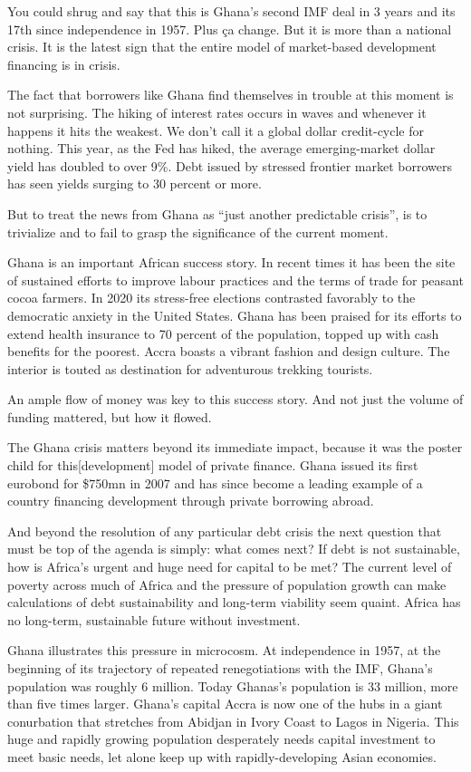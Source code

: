 \documentclass[
]{book}
\begin{document}
You could shrug and say that this is Ghana's second IMF deal in 3 years and its 17th since independence in 1957. Plus ça change. But it is more than a national crisis. It is the latest sign that the entire model of market-based development financing is in crisis.

The fact that borrowers like Ghana find themselves in trouble at this moment is not surprising. The hiking of interest rates occurs in waves and whenever it happens it hits the weakest. We don't call it a global dollar credit-cycle for nothing. This year, as the Fed has hiked, the average emerging-market dollar yield has doubled to over 9\%. Debt issued by stressed frontier market borrowers has seen yields surging to 30 percent or more.

But to treat the news from Ghana as ``just another predictable crisis'', is to trivialize and to fail to grasp the significance of the current moment.

Ghana is an important African success story. In recent times it has been the site of sustained efforts to improve labour practices and the terms of trade for peasant cocoa farmers.
In 2020 its stress-free elections contrasted favorably to the democratic anxiety in the United States. Ghana has been praised for its efforts to extend health insurance to 70 percent of the population, topped up with cash benefits for the poorest. Accra boasts a vibrant fashion and design culture. The interior is touted as destination for adventurous trekking tourists.

An ample flow of money was key to this success story. And not just the volume of funding mattered, but how it flowed.

The Ghana crisis matters beyond its immediate impact, because it was the poster child for this{[}development{]} model of private finance.
Ghana issued its first eurobond for \$750mn in 2007 and has since become a leading example of a country financing development through private borrowing abroad.

And beyond the resolution of any particular debt crisis the next question that must be top of the agenda is simply: what comes next? If debt is not sustainable, how is Africa's urgent and huge need for capital to be met? The current level of poverty across much of Africa and the pressure of population growth can make calculations of debt sustainability and long-term viability seem quaint. Africa has no long-term, sustainable future without investment.

Ghana illustrates this pressure in microcosm. At independence in 1957, at the beginning of its trajectory of repeated renegotiations with the IMF, Ghana's population was roughly 6 million. Today Ghanas's population is 33 million, more than five times larger. Ghana's capital Accra is now one of the hubs in a giant conurbation that stretches from Abidjan in Ivory Coast to Lagos in Nigeria. This huge and rapidly growing population desperately needs capital investment to meet basic needs, let alone keep up with rapidly-developing Asian economies.
\end{document}
